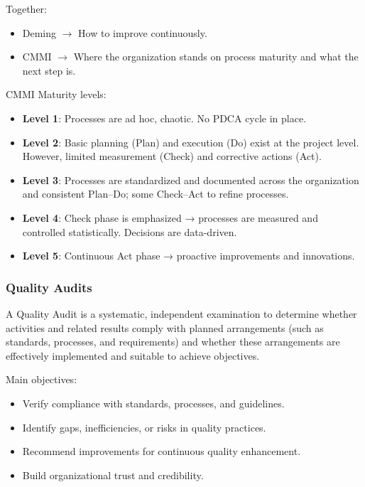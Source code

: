 Together:

\begin{itemize}
    \item Deming $\xrightarrow{}$ How to improve continuously.
    \item CMMI $\xrightarrow{}$ Where the organization stands on process maturity and what the next step is.
\end{itemize}

\bigskip

CMMI Maturity levels:

\begin{itemize}
    \item \textbf{Level 1}: Processes are ad hoc, chaotic. No PDCA cycle in place.
    \item \textbf{Level 2}: Basic planning (Plan) and execution (Do) exist at the project level. However, limited measurement (Check) and corrective actions (Act).
    \item \textbf{Level 3}: Processes are standardized and documented across the organization and consistent Plan–Do; some Check–Act to refine processes.
    \item \textbf{Level 4}: Check phase is emphasized → processes are measured and controlled statistically. Decisions are data-driven.
    \item \textbf{Level 5}: Continuous Act phase → proactive improvements and innovations.
\end{itemize}

\subsubsection{Quality Audits}

\indent 

A Quality Audit is a systematic, independent examination to determine whether activities and related results comply with planned arrangements (such as standards, processes, and requirements) and whether these arrangements are effectively implemented and suitable to achieve objectives.

\bigskip

Main objectives:

\begin{itemize}
    \item Verify compliance with standards, processes, and guidelines.
    \item Identify gaps, inefficiencies, or risks in quality practices.
    \item Recommend improvements for continuous quality enhancement.
    \item Build organizational trust and credibility.
\end{itemize}

